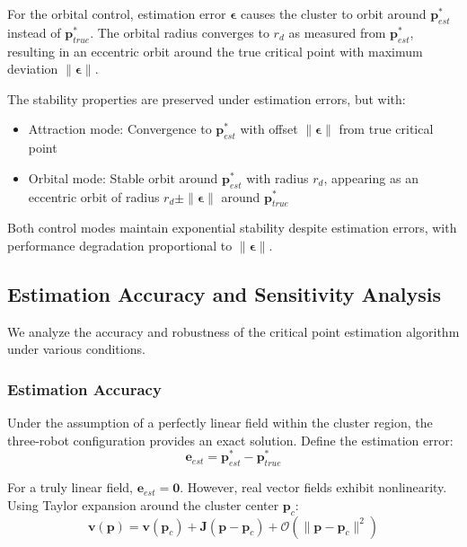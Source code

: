 \documentclass[lettersize,journal]{IEEEtran}
\begin{document}
For the orbital control, estimation error $\boldsymbol{\epsilon}$ causes the cluster to orbit around $\mathbf{p}^*_{est}$ instead of $\mathbf{p}^*_{true}$. The orbital radius converges to $r_d$ as measured from $\mathbf{p}^*_{est}$, resulting in an eccentric orbit around the true critical point with maximum deviation $\|\boldsymbol{\epsilon}\|$.

The stability properties are preserved under estimation errors, but with:
\begin{itemize}
\item Attraction mode: Convergence to $\mathbf{p}^*_{est}$ with offset $\|\boldsymbol{\epsilon}\|$ from true critical point
\item Orbital mode: Stable orbit around $\mathbf{p}^*_{est}$ with radius $r_d$, appearing as an eccentric orbit of radius $r_d \pm \|\boldsymbol{\epsilon}\|$ around $\mathbf{p}^*_{true}$
\end{itemize}

Both control modes maintain exponential stability despite estimation errors, with performance degradation proportional to $\|\boldsymbol{\epsilon}\|$.

\subsection{Estimation Accuracy and Sensitivity Analysis}

We analyze the accuracy and robustness of the critical point estimation algorithm under various conditions.

\subsubsection{Estimation Accuracy}

Under the assumption of a perfectly linear field within the cluster region, the three-robot configuration provides an exact solution. Define the estimation error:
\begin{equation}
\mathbf{e}_{est} = \mathbf{p}^*_{est} - \mathbf{p}^*_{true}
\end{equation}

For a truly linear field, $\mathbf{e}_{est} = \mathbf{0}$. However, real vector fields exhibit nonlinearity. Using Taylor expansion around the cluster center $\mathbf{p}_c$:
\begin{equation}
\mathbf{v}(\mathbf{p}) = \mathbf{v}(\mathbf{p}_c) + \mathbf{J}(\mathbf{p} - \mathbf{p}_c) + \mathcal{O}(\|\mathbf{p} - \mathbf{p}_c\|^2)
\end{equation}
\end{document}
